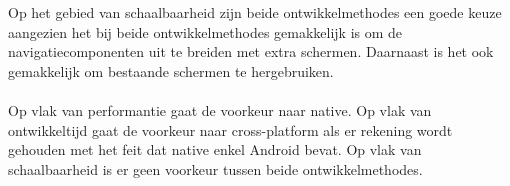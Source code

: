 Op het gebied van schaalbaarheid zijn beide ontwikkelmethodes een goede keuze aangezien 
het bij beide ontwikkelmethodes gemakkelijk is om de navigatiecomponenten uit te breiden met extra schermen. 
Daarnaast is het ook gemakkelijk om bestaande schermen te hergebruiken.
\\\\
Op vlak van performantie gaat de voorkeur naar native. Op vlak van ontwikkeltijd gaat de voorkeur naar cross-platform
als er rekening wordt gehouden met het feit dat native enkel Android bevat. Op vlak van schaalbaarheid 
is er geen voorkeur tussen beide ontwikkelmethodes.




















